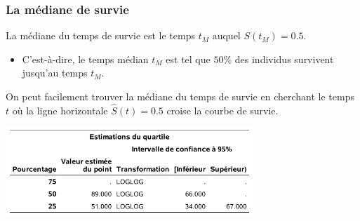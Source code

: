 \documentclass{beamer}
\begin{document}
\begin{frame}[fragile]
\frametitle{La médiane de survie}
 La médiane du temps de survie est le temps $t_M$ auquel $S(t_M)=0.5$. 
\begin{itemize}
 \item C'est-à-dire, le temps médian $t_M$ est tel que $50\%$ des individus survivent jusqu'au temps $t_M$. 
\end{itemize}
 On peut facilement trouver la médiane du temps de survie en cherchant le temps $t$ o\`u la ligne horizontale $\widehat{S}(t) = 0.5$ croise la courbe de survie. 
\begin{center}
\includegraphics[width = 0.7\textwidth]{img/c7/diapos7e07}
\end{center}

\end{frame}

%   
\end{document}
